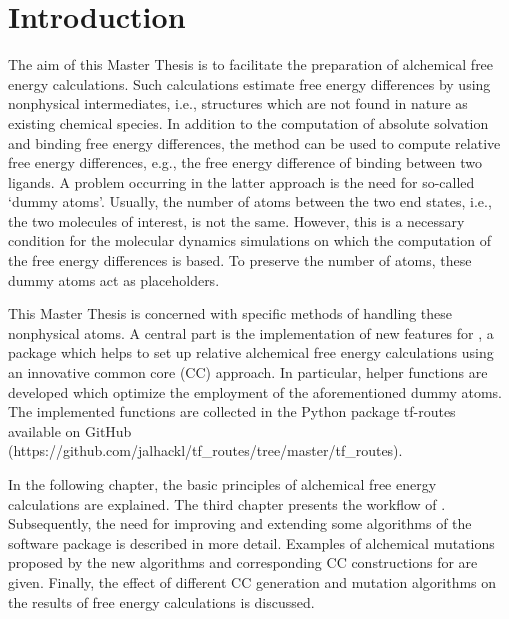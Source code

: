 \chapter{Introduction}

The aim of this Master Thesis is to facilitate the preparation of
alchemical free energy calculations. Such calculations
estimate free energy differences by using nonphysical intermediates, i.e., structures
which are not found in nature as existing chemical species. In addition
to the computation of absolute solvation and binding free energy differences,
the method can be used to compute relative free energy differences, e.g.,
the free energy difference of binding between two ligands. A problem occurring
in the latter approach is the need for so-called \textquoteleft dummy
atoms\textquoteright{}. Usually, the number of atoms between the two
end states, i.e., the two molecules of interest, is not the same.
However, this is a necessary condition for the molecular dynamics
simulations on which the computation of the free energy differences
is based. To preserve the number of atoms, these dummy atoms act as
placeholders\cite{Fleck.2021, Karwounopoulos.2022}.

This Master Thesis is concerned with specific methods of handling these nonphysical
atoms. A central part is the implementation of new features
for \trafo, a package which helps to set up relative alchemical
free energy calculations using an innovative common core (CC) approach\cite{key-2, Wieder.2022}.
In particular, helper functions are developed which optimize the employment of
the aforementioned dummy atoms. 
The implemented functions are collected in the  Python package tf-routes available on GitHub (https://github.com/jalhackl/tf\_routes/tree/master/tf\_routes).

In the following chapter, the basic principles of alchemical free energy
calculations are explained. The third chapter presents the workflow
of \trafo. Subsequently, the need for improving and extending some algorithms of the software
package is described in more detail. Examples of alchemical mutations
proposed by the new algorithms and corresponding CC constructions
for \trafo are given. Finally, the effect of different CC generation and mutation
algorithms on the results of free energy calculations is discussed.

